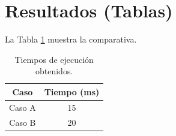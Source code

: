 \section{Resultados (Tablas)}
La Tabla \ref{TAB:RESULTADOS} muestra la comparativa.
\begin{table}[h]
    \centering
    \begin{tabular}{|c|c|}
        \hline
        \textbf{Caso} & \textbf{Tiempo (ms)} \\
        \hline
        Caso A & 15 \\
        Caso B & 20 \\
        \hline
    \end{tabular}
    \caption{Tiempos de ejecución obtenidos.}
    \label{TAB:RESULTADOS}
\end{table}